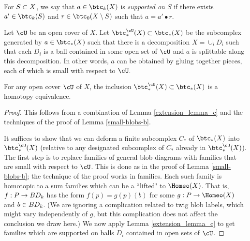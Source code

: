 For $S\subset X$, we say that $a\in \btc_k(X)$ is {\it supported on $S$}
if there exists $a'\in \btc_k(S)$
and $r\in \btc_0(X\setmin S)$ such that $a = a'\bullet r$.

\newcommand\sbtc{\btc^{\cU}}
Let $\cU$ be an open cover of $X$.
Let $\sbtc_*(X)\sub\btc_*(X)$ be the subcomplex generated by
$a\in \btc_*(X)$ such that there is a decomposition $X = \cup_i D_i$
such that each $D_i$ is a ball contained in some open set of $\cU$ and
$a$ is splittable along this decomposition.
In other words, $a$ can be obtained by gluing together pieces, each of which
is small with respect to $\cU$.

\begin{lemma} \label{small-top-blobs}
For any open cover $\cU$ of $X$, the inclusion $\sbtc_*(X)\sub\btc_*(X)$
is a homotopy equivalence.
\end{lemma}
\begin{proof}
This follows from a combination of Lemma \ref{extension_lemma_c} and the techniques of
the proof of Lemma \ref{small-blobs-b}.

It suffices to show that we can deform a finite subcomplex $C_*$ of $\btc_*(X)$ into $\sbtc_*(X)$
(relative to any designated subcomplex of $C_*$ already in $\sbtc_*(X)$).
The first step is to replace families of general blob diagrams with families that are 
small with respect to $\cU$.
This is done as in the proof of Lemma \ref{small-blobs-b}; the technique of the proof works in families.
Each such family is homotopic to a sum families which can be a ``lifted" to $\Homeo(X)$.
That is, $f:P \to BD_k$ has the form $f(p) = g(p)(b)$ for some $g:P\to \Homeo(X)$ and $b\in BD_k$.
(We are ignoring a complication related to twig blob labels, which might vary
independently of $g$, but this complication does not affect the conclusion we draw here.)
We now apply Lemma \ref{extension_lemma_c} to get families which are supported 
on balls $D_i$ contained in open sets of $\cU$.
\end{proof}


